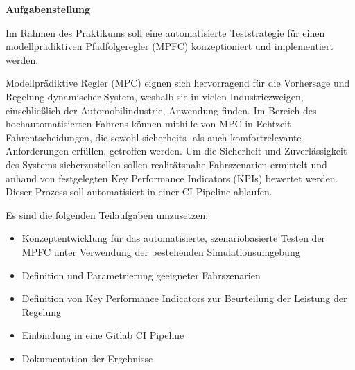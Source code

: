 \noindent\textbf{Aufgabenstellung}\smallskip

\noindent Im Rahmen des Praktikums soll eine automatisierte Teststrategie für einen modellprädiktiven Pfadfolgeregler (MPFC) konzeptioniert und implementiert werden.

Modellprädiktive Regler (MPC) eignen sich hervorragend für die Vorhersage und Regelung dynamischer System, weshalb sie in vielen Industriezweigen, einschließlich der Automobilindustrie, Anwendung finden. Im Bereich des hochautomatisierten Fahrens können mithilfe von MPC in Echtzeit Fahrentscheidungen, die sowohl sicherheits- als auch komfortrelevante Anforderungen erfüllen, getroffen werden. Um die Sicherheit und Zuverlässigkeit des Systems sicherzustellen sollen realitätsnahe Fahrszenarien ermittelt und anhand von festgelegten Key Performance Indicators (KPIs) bewertet werden. Dieser Prozess soll automatisiert in einer CI Pipeline ablaufen.\medskip

\noindent Es sind die folgenden Teilaufgaben umzusetzen:
\begin{itemize}
    \item Konzeptentwicklung für das automatisierte, szenariobasierte Testen der MPFC unter Verwendung der bestehenden Simulationsumgebung
    \item Definition und Parametrierung geeigneter Fahrszenarien
    \item Definition von Key Performance Indicators zur Beurteilung der Leistung der Regelung
    \item Einbindung in eine Gitlab CI Pipeline
    \item Dokumentation der Ergebnisse
\end{itemize}

